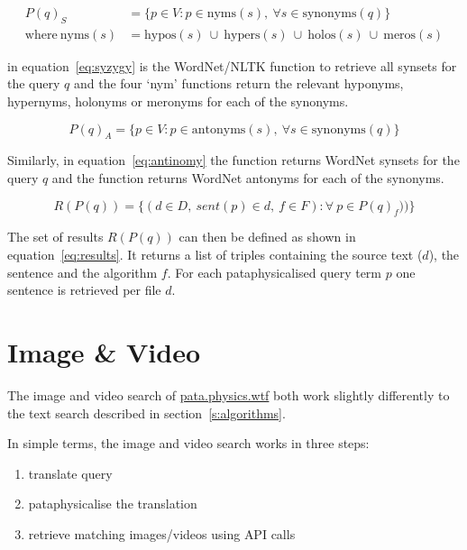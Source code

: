 \begin{equation}
  \begin{split}
    P(q)_S &= \{p \in V: p \in \text{nyms}(s), \ \forall s \in \text{synonyms}(q)\}\\
    \text{where} \ \text{nyms}(s) &= \text{hypos}(s) \ \cup \ \text{hypers}(s) \ \cup \ \text{holos}(s) \ \cup \ \text{meros}(s)
  \end{split}
  \label{eq:syzygy}
\end{equation}

 in equation~\ref{eq:syzygy}\marginnote{$\bm{\Sigma}$~\ref{eq:syzygy}} is the WordNet/\ac{NLTK} function to retrieve all synsets for the query $q$ and the four `nym' functions return the relevant hyponyms, hypernyms, holonyms or meronyms for each of the synonyms.

\begin{equation}
  P(q)_A = \{p \in V: p \in \text{antonyms}(s), \ \forall s \in \text{synonyms}(q)\}
  \label{eq:antinomy}
\end{equation}

Similarly, in equation~\ref{eq:antinomy}\marginnote{$\bm{\Sigma}$~\ref{eq:antinomy}} the  function returns WordNet synsets for the query $q$ and the  function returns WordNet antonyms for each of the synonyms.

\begin{equation}
  R(P(q)) = \{(d \in D, \ sent(p) \in d, \ f \in F): \forall \ p \in P(q)_f)) \}
  \label{eq:results}
\end{equation}

The set of results $R(P(q))$ can then be defined as shown in equation~\ref{eq:results}\marginnote{$\bm{\Sigma}$~\ref{eq:results}}. It returns a list of triples containing the source text ($d$), the sentence  and the algorithm $f$. For each pataphysicalised query term $p$ one sentence is retrieved per file $d$.


\section{Image \& Video}
\label{s:imgvid}

The image and video search of \url{pata.physics.wtf} both work slightly differently to the text search described in section~\ref{s:algorithms}.

In simple terms, the image and video search works in three steps:
\begin{enumerate}
  \item translate query
  \item pataphysicalise the translation
  \item retrieve matching images/videos using \ac{API} calls
\end{enumerate}

